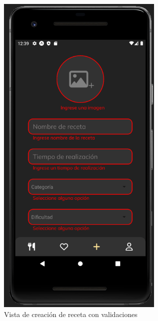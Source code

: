 \begin{figure}[!h]
  \centering
  \includegraphics[width=8cm, scale=1]{Images/Imagenes/add3.png}
  \caption{Vista de creación de receta con validaciones}
  \label{fig:add3}
\end{figure}

